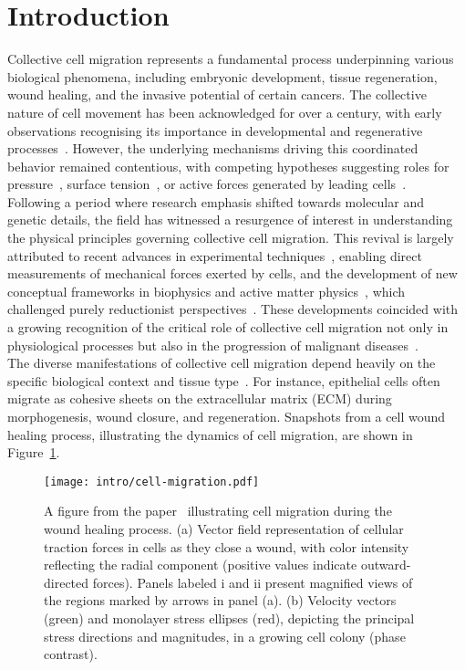 \section{Introduction}
Collective cell migration represents a fundamental process underpinning various biological phenomena, including embryonic development, tissue regeneration, wound healing, and the invasive potential of certain cancers. 
The collective nature of cell movement has been acknowledged for over a century, with early observations recognising its importance in developmental and regenerative processes~\cite{alert2020, holmes1914, herrick1932, vaughan1966}. 
However, the underlying mechanisms driving this coordinated behavior remained contentious, with competing hypotheses suggesting roles for pressure~\cite{herrick1932}, surface tension~\cite{alert2020}, or active forces generated by leading cells~\cite{holmes1914}. \\
Following a period where research emphasis shifted towards molecular and genetic details, the field has witnessed a resurgence of interest in understanding the physical principles governing collective cell migration. 
This revival is largely attributed to recent advances in experimental techniques~\cite{roca2017, du2005, trepat2009}, enabling direct measurements of mechanical forces exerted by cells, and the development of new conceptual frameworks in biophysics and active matter physics~\cite{marchetti2013, prost2015, julicher2018}, which challenged purely reductionist perspectives~\cite{good2018}. 
These developments coincided with a growing recognition of the critical role of collective cell migration not only in physiological processes but also in the progression of malignant diseases~\cite{friedl1995}. \\
The diverse manifestations of collective cell migration depend heavily on the specific biological context and tissue type~\cite{friedl2009}. 
For instance, epithelial cells often migrate as cohesive sheets on the extracellular matrix (ECM) during morphogenesis, wound closure, and regeneration. 
Snapshots from a cell wound healing process, illustrating the dynamics of cell migration, are shown in Figure~\ref{fig:woundhealing}. 

\begin{figure}[h!]
	\centering
	\texttt{[image: intro/cell-migration.pdf]}
	\caption{A figure from the paper~\cite{alert2020} illustrating cell migration during the wound healing process. 
	(a) Vector field representation of cellular traction forces in cells as they close a wound, with color intensity reflecting the radial component (positive values indicate outward-directed forces). 
	Panels labeled i and ii present magnified views of the regions marked by arrows in panel (a). 
	(b) Velocity vectors (green) and monolayer stress ellipses (red), depicting the principal stress directions and magnitudes, in a growing cell colony (phase contrast). 
	}
	\label{fig:woundhealing}
\end{figure}


